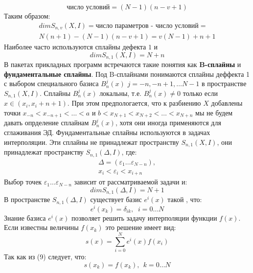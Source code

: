 \begin{equation}
\textit{число условий} = (N-1)(n-v+1)
\end{equation}
Таким образом:
\begin{equation}
\begin{aligned}dim S_{n,v}(X,I) = \textit{число параметров - число условий} =\\
 N(n+1)-(N-1)(n-v+1)=v(N-1)+n+1\end{aligned}
\end{equation}
Наиболее часто используются сплайны дефекта $1$ и
\begin{equation}
dim  S_{n,1}(X,I) = N+n
\end{equation}
В пакетах прикладных программ встречаются такие понятия как \textbf{B-сплайны} и \textbf{фундаментальные сплайны}. Под B-сплайнами понимаются сплайны деффекта 1 с выбором специального базиса $B_n^j(x)$ $j=-n,-n+1,\ldots N-1$ в пространстве $S_{n,1}(X,I)$. Сплайны $B_n^j(x)$ локальны, т.е.  $B_n^j(x)\neq 0$ только если $x\in(x_i,x_i+n+1)$. При этом предпологается, что к разбиению $X$ добавлены точки $x_{-n}<x_{-n+1}<\ldots<a$ и $b<x_{N+1}<x_{N+2}<\ldots<x_{N+n}$ мы не будем давать опрделение сплайнам $B_n^j(x)$, хотя они иногда применяются для сглаживания ЭД.
Фундаментальные сплайны используются в задачах интерполяции. Эти сплайны не принадлежат пространству $S_{n,1}(X,I)$,  они принадлежат пространству $S_{n,1}(\Delta,I)$, где:
\begin{equation}
\begin{aligned}\Delta=(\varepsilon_1\ldots\varepsilon_{N-n}), \\
x_i<\varepsilon_i<x_{i+n}\end{aligned}
\end{equation}
Выбор точек $\varepsilon_1\ldots\varepsilon_{N-n}$ зависит от рассматриваемой задачи и:
\begin{equation}
dim  S_{n,1}(\Delta,I) = N+1
\end{equation}
В пространстве $S_{n,1}(\Delta,I)$ существует базис $e^i(x)$ такой , что:
\begin{equation}
e^i(x_k)=\delta_{ik},\;\; 	i=0\ldots N
\end{equation}
Знание базиса $e^i(x)$ позволяет решить задачу интерполяции функции $f(x)$. Если известны величины $f(x_k)$ это решение имеет вид:
\begin{equation}
s\left( x\right) =\sum ^{N}_{i=0}e^{i}\left( x\right) f\left( x_{i}\right)
\end{equation}
Так как из (9) следует, что:
\begin{equation}
s\left( x_k\right) =f\left( x_{k}\right),\ \  k=0\ldots N
\end{equation}

